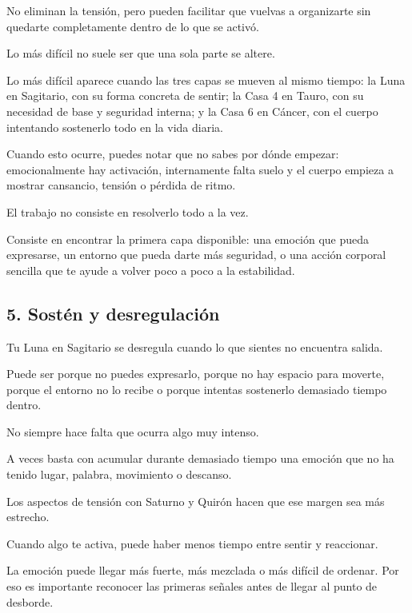 \documentclass[11pt,a4paper]{article}
\begin{document}
No eliminan la tensión, pero pueden facilitar que vuelvas a organizarte sin quedarte completamente dentro de lo que se activó.

Lo más difícil no suele ser que una sola parte se altere.

Lo más difícil aparece cuando las tres capas se mueven al mismo tiempo:
la Luna en Sagitario, con su forma concreta de sentir;
la Casa 4 en Tauro, con su necesidad de base y seguridad interna;
y la Casa 6 en Cáncer, con el cuerpo intentando sostenerlo todo en la vida diaria.

Cuando esto ocurre, puedes notar que no sabes por dónde empezar: emocionalmente hay activación, internamente falta suelo y el cuerpo empieza a mostrar cansancio, tensión o pérdida de ritmo.

El trabajo no consiste en resolverlo todo a la vez.

Consiste en encontrar la primera capa disponible: una emoción que pueda expresarse, un entorno que pueda darte más seguridad, o una acción corporal sencilla que te ayude a volver poco a poco a la estabilidad.

\vspace{0.8cm}

\subsection{5. Sostén y desregulación}

Tu Luna en Sagitario se desregula cuando lo que sientes no encuentra salida.

Puede ser porque no puedes expresarlo, porque no hay espacio para moverte, porque el entorno no lo recibe o porque intentas sostenerlo demasiado tiempo dentro.

No siempre hace falta que ocurra algo muy intenso.

A veces basta con acumular durante demasiado tiempo una emoción que no ha tenido lugar, palabra, movimiento o descanso.

Los aspectos de tensión con Saturno y Quirón hacen que ese margen sea más estrecho.

Cuando algo te activa, puede haber menos tiempo entre sentir y reaccionar.

La emoción puede llegar más fuerte, más mezclada o más difícil de ordenar. Por eso es importante reconocer las primeras señales antes de llegar al punto de desborde.
\end{document}
